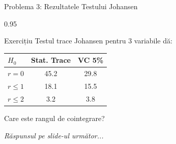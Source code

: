 \documentclass[9pt, aspectratio=169, t]{beamer}
\begin{document}
\begin{frame}{Problema 3: Rezultatele Testului Johansen}
    \begin{cminipage}{0.95\textwidth}
    \begin{block}{Exercițiu}
        Testul trace Johansen pentru 3 variabile dă:
        \begin{center}
        \begin{tabular}{lcc}
            \toprule
            $H_0$ & Stat. Trace & VC 5\% \\
            \midrule
            $r = 0$ & 45.2 & 29.8 \\
            $r \leq 1$ & 18.1 & 15.5 \\
            $r \leq 2$ & 3.2 & 3.8 \\
            \bottomrule
        \end{tabular}
        \end{center}
        Care este rangul de cointegrare?
    \end{block}

    \vspace{0.5cm}
    \begin{flushright}\textit{Răspunsul pe slide-ul următor...}\end{flushright}
    \end{cminipage}
\end{frame}
\end{document}
